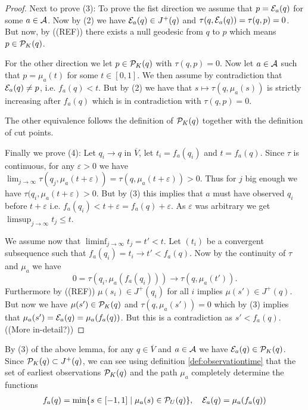 \begin{proof}
Next to prove (3):
To prove the fist direction we assume that $p=\mc{E}_a(q)$ for some $a\in \mc{A}$. Now by (2) we have $\mc{E}_a(q) \in J^+(q)$ and $\tau(q,\mc{E}_a(q))=\tau(q,p)=0$. But now, by ((REF)) there exists a null geodesic from $q$ to $p$ which means $p\in \mc{P}_K(q)$. 

For the other direction we let $p\in \mc{P}_K(q)$ with $\tau(q,p)=0$. Now let $a\in \mc{A}$ such that $p=\mu_a(t)$ for some $t\in [0,1]$. We then assume by contradiction that $\mc{E}_a(q) \neq p$, i.e. $f_a(q) < t$. But by (2) we have that $s\mapsto\tau(q,\mu_a(s))$ is strictly increasing after $f_a(q)$ which is in contradiction with $\tau(q,p)=0$.

The other equivalence follows the definition of $\mc{P}_K(q)$ together with the definition of cut points.

Finally we prove (4):
Let $q_i\to q$ in $\overline{V}$, let $t_i = f_a(q_i)$ and $t=f_a(q)$. Since $\tau$ is continuous, for any $\varepsilon>0$ we have $\lim_{j\to \infty} \tau(q_j,\mu_a(t+\varepsilon)) = \tau(q,\mu_a(t+\varepsilon)) > 0$. Thus for $j$ big enough we have $\tau(q_i,\mu_a(t+\varepsilon)>0$. But by (3) this implies that $a$ must have observed $q_i$ before $t+\varepsilon$ i.e. $f_a(q_i)<t+\varepsilon = f_a(q) + \varepsilon$. As $\varepsilon$ was arbitrary we get $\limsup_{j\to \infty} t_j \leq t$.

We assume now that $\liminf_{j\to \infty} t_j=t'<t$. Let $(t_i)$ be a convergent subsequence such that $f_a(q_i) = t_i \to t' < f_a(q)$. Now by the continuity of $\tau$ and $\mu_a$ we have 
\[
0=\tau(q_i,\mu_a(f_a(q_i)))\to \tau(q,\mu_a(t')).
\]
Furthermore by ((REF)) $\mu(s_i)\in J^+(q_i)$ for all $i$ implies $\mu(s')\in J^+(q)$. But now we have $\mu(s')\in \mc{P}_K(q)$ and $\tau(q,\mu_a(s'))=0$ which by (3) implies that $\mu_a(s') = \mc{E}_a(q) = \mu_a(f_a(q))$. But this is a contradiction as $s'<f_a(q)$. ((More in-detail?))
\end{proof}

By (3) of the above lemma, for any $q\in \overline{V}$ and $a\in \ca$ we have $\mc{E}_a(q)\in \P_K(q)$. Since $\P_K(q)\subset J^+(q)$, we can see using definition \ref{def:observationtime} that the set of earliest observations $\P_K(q)$ and the path $\mu_a$ completely determine the functions
\begin{align}\label{eq:observationtimerestated}
    f_a(q) = \min \{ s\in [-1,1] \mid \mu_a(s)\in \P_U(q) \}, \quad \mc{E}_a(q) = \mu_a(f_a(q))
\end{align}


